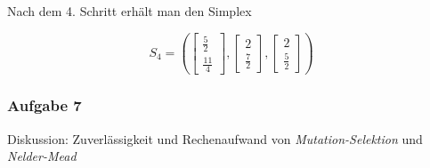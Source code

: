 \documentclass[a4paper, 12pt]{report}
\begin{document}
Nach dem 4. Schritt erhält man den Simplex

$$S_4 = (\begin{bmatrix}\frac{5}{2}\\\frac{11}{4}\end{bmatrix}, \begin{bmatrix}2\\\frac{7}{2}\end{bmatrix}, \begin{bmatrix}2\\\frac{5}{2}\end{bmatrix})$$

\subsubsection{Aufgabe 7}
Diskussion: Zuverlässigkeit und Rechenaufwand von \textit{Mutation-Selektion} und \textit{Nelder-Mead}
\end{document}
